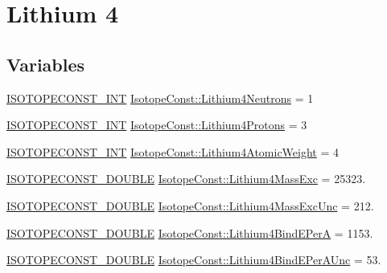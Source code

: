 \hypertarget{group___isotope_const-_lithium-_li4}{}\section{Lithium 4}
\label{group___isotope_const-_lithium-_li4}
\subsection*{Variables}
\begin{DoxyCompactItemize}
\item 
\mbox{\hyperlink{group___isotope_const-_macros_ga5f18360b3e99483a35c32d789e62621c}{I\+S\+O\+T\+O\+P\+E\+C\+O\+N\+S\+T\+\_\+\+I\+NT}} \mbox{\hyperlink{group___isotope_const-_lithium-_li4_gad07d5ff90219376b8d8d862a18920c2b}{Isotope\+Const\+::\+Lithium4\+Neutrons}} = 1
\item 
\mbox{\hyperlink{group___isotope_const-_macros_ga5f18360b3e99483a35c32d789e62621c}{I\+S\+O\+T\+O\+P\+E\+C\+O\+N\+S\+T\+\_\+\+I\+NT}} \mbox{\hyperlink{group___isotope_const-_lithium-_li4_ga96019360db51d3f7c91c04265102c0b7}{Isotope\+Const\+::\+Lithium4\+Protons}} = 3
\item 
\mbox{\hyperlink{group___isotope_const-_macros_ga5f18360b3e99483a35c32d789e62621c}{I\+S\+O\+T\+O\+P\+E\+C\+O\+N\+S\+T\+\_\+\+I\+NT}} \mbox{\hyperlink{group___isotope_const-_lithium-_li4_ga1bac4594a56b5af87ac2972f6905737e}{Isotope\+Const\+::\+Lithium4\+Atomic\+Weight}} = 4
\item 
\mbox{\hyperlink{group___isotope_const-_macros_ga8f45a7272ce02c0b4c65c44636ed719a}{I\+S\+O\+T\+O\+P\+E\+C\+O\+N\+S\+T\+\_\+\+D\+O\+U\+B\+LE}} \mbox{\hyperlink{group___isotope_const-_lithium-_li4_ga63c26f05e41a10df846307abb4701716}{Isotope\+Const\+::\+Lithium4\+Mass\+Exc}} = 25323.
\item 
\mbox{\hyperlink{group___isotope_const-_macros_ga8f45a7272ce02c0b4c65c44636ed719a}{I\+S\+O\+T\+O\+P\+E\+C\+O\+N\+S\+T\+\_\+\+D\+O\+U\+B\+LE}} \mbox{\hyperlink{group___isotope_const-_lithium-_li4_ga5df3d55282de04c017840d20cedf0991}{Isotope\+Const\+::\+Lithium4\+Mass\+Exc\+Unc}} = 212.
\item 
\mbox{\hyperlink{group___isotope_const-_macros_ga8f45a7272ce02c0b4c65c44636ed719a}{I\+S\+O\+T\+O\+P\+E\+C\+O\+N\+S\+T\+\_\+\+D\+O\+U\+B\+LE}} \mbox{\hyperlink{group___isotope_const-_lithium-_li4_ga201847920a9880f2ac2144fe833f993d}{Isotope\+Const\+::\+Lithium4\+Bind\+E\+PerA}} = 1153.
\item 
\mbox{\hyperlink{group___isotope_const-_macros_ga8f45a7272ce02c0b4c65c44636ed719a}{I\+S\+O\+T\+O\+P\+E\+C\+O\+N\+S\+T\+\_\+\+D\+O\+U\+B\+LE}} \mbox{\hyperlink{group___isotope_const-_lithium-_li4_gaaf96bf0a9b53b8378afde55b647ccdc1}{Isotope\+Const\+::\+Lithium4\+Bind\+E\+Per\+A\+Unc}} = 53.

\end{DoxyCompactItemize}
